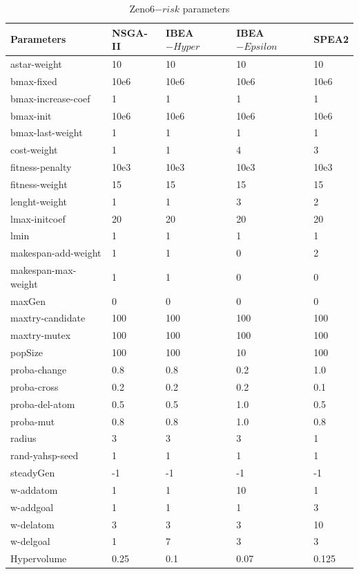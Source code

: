 \documentclass[a4paper,10pt]{article}
\begin{document}
 \begin{table}	[h]
\scriptsize											
\begin{tabular}{|l|l|l|l|l|}									

\hline	
Parameters & NSGA-II &  IBEA$-{Hyper}$ &  IBEA$-{Epsilon}$ & SPEA2\\	
\hline
astar-weight	&	10	&	10		&	10	&	10	\\
bmax-fixed	&	10e6	&	10e6		&	10e6	&	10e6	\\
bmax-increase-coef	&	1	&	1		&	1	&	1	\\
bmax-init	&	10e6	&	10e6		&	10e6	&	10e6	\\
bmax-last-weight	&	1	&	1		&	1	&	1	\\
cost-weight	&	1	&	1		&	4	&	3	\\
fitness-penalty	&	10e3	&	10e3		&	10e3	&	10e3	\\
fitness-weight	&	15	&	15		&	15	&	15	\\
lenght-weight	&	1	&	1		&	3	&	2	\\
lmax-initcoef	&	20	&	20		&	20	&	20	\\
lmin	&	1	&	1		&	1	&	1	\\
makespan-add-weight	&	1	&	1		&	0	&	2	\\
makespan-max-weight	&	1	&	1		&	0	&	0	\\
maxGen	&	0	&	0		&	0	&	0	\\
maxtry-candidate	&	100	&	100		&	100	&	100	\\
maxtry-mutex	&	100	&	100		&	100	&	100	\\
popSize	&	100	&	100		&	10	&	100	\\
proba-change	&	0.8	&	0.8		&	0.2	&	1.0	\\
proba-cross	&	0.2	&	0.2		&	0.2	&	0.1	\\
proba-del-atom	&	0.5	&	0.5		&	1.0	&	0.5	\\
proba-mut	&	0.8	&	0.8		&	1.0	&	0.8	\\
radius	&	3	&	3		&	3	&	1	\\
rand-yahsp-seed	&	1	&	1		&	1	&	1	\\
steadyGen	&	-1	&	-1		&	-1	&	-1	\\
w-addatom	&	1	&	1		&	10	&	1	\\
w-addgoal	&	1	&	1		&	1	&	3	\\
w-delatom	&	3	&	3		&	3	&	10	\\
w-delgoal	&	1	&	7		&	3	&	3	\\
\hline										
Hypervolume	&	0.25	&	0.1		&	0.07	&	0.125	\\
\hline


\end{tabular}
\caption{Zeno6$-{risk}$ parameters}
\end{table}
\end{document}
